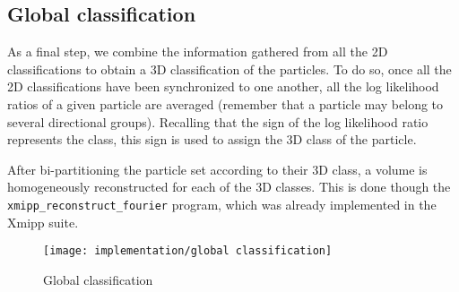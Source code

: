 \documentclass[../main.tex]{subfiles}
\begin{document}
\subsection{Global classification}
As a final step, we combine the information gathered from all the 2D classifications to obtain a 3D classification of the particles. To do so, once all the 2D classifications have been synchronized to one another, all the log likelihood ratios of a given particle are averaged (remember that a particle may belong to several directional groups). Recalling that the sign of the log likelihood ratio represents the class, this sign is used to assign the 3D class of the particle.

After bi-partitioning the particle set according to their 3D class, a volume is homogeneously reconstructed for each of the 3D classes. This is done though the \texttt{xmipp\_reconstruct\_fourier} program, which was already implemented in the Xmipp suite\cite{strelak2019}.

\begin{figure}
    \centering
    \texttt{[image: implementation/global classification]}
    \caption{Global classification}
    \label{fig:4.1:global}
\end{figure}
\end{document}

